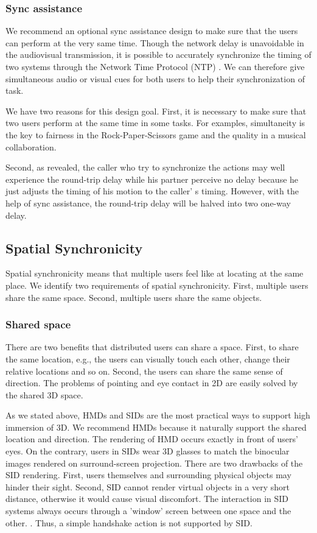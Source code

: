 \subsubsection{Sync assistance}

We recommend an optional sync assistance design to make sure that the users can perform at the very same time. Though the network delay is unavoidable in the audiovisual transmission, it is possible to accurately synchronize the timing of two systems through the Network Time Protocol (NTP) \cite{mills1991internet}. We can therefore give simultaneous audio or visual cues for both users to help their synchronization of task.

We have two reasons for this design goal. First, it is necessary to make sure that two users perform at the same time in some tasks. For examples, simultaneity is the key to fairness in the Rock-Paper-Scissors game and the quality in a musical collaboration.

Second, as \cite{hashimoto2006influences} revealed, the caller who try to synchronize the actions may well experience the round-trip delay while his partner perceive no delay because he just adjusts the timing of his motion to the caller' s timing. However, with the help of sync assistance, the round-trip delay will be halved into two one-way delay.

\subsection{Spatial Synchronicity}

Spatial synchronicity means that multiple users feel like at locating at the same place. We identify two requirements of spatial synchronicity. First, multiple users share the same space. Second, multiple users share the same objects.

\subsubsection{Shared space}

There are two benefits that distributed users can share a space. First, to share the same location, e.g., the users can visually touch each other, change their relative locations and so on. Second, the users can share the same sense of direction. The problems of pointing and eye contact in 2D are easily solved by the shared 3D space.

As we stated above, HMDs and SIDs are the most practical ways to support high immersion of 3D. We recommend HMDs because it naturally support the shared location and direction. The rendering of HMD occurs exactly in front of users' eyes. On the contrary, users in SIDs wear 3D glasses to match the binocular images rendered on surround-screen projection. There are two drawbacks of the SID rendering. First, users themselves and surrounding physical objects may hinder their sight. Second, SID cannot render virtual objects in a very short distance, otherwise it would cause visual discomfort. The interaction in SID systems always occurs through a 'window' screen between one space and the other. \cite{orts2016holoportation}. Thus, a simple handshake action is not supported by SID.

